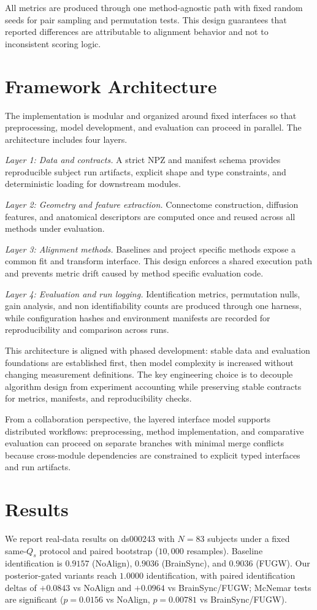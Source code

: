 \documentclass[conference]{IEEEtran}
\begin{document}
All metrics are produced through one method-agnostic path with fixed random seeds for pair sampling and permutation tests. This design guarantees that reported differences are attributable to alignment behavior and not to inconsistent scoring logic.

\section{Framework Architecture}
The implementation is modular and organized around fixed interfaces so that preprocessing, model development, and evaluation can proceed in parallel. The architecture includes four layers.

\textit{Layer 1: Data and contracts.} A strict NPZ and manifest schema provides reproducible subject run artifacts, explicit shape and type constraints, and deterministic loading for downstream modules.

\textit{Layer 2: Geometry and feature extraction.} Connectome construction, diffusion features, and anatomical descriptors are computed once and reused across all methods under evaluation.

\textit{Layer 3: Alignment methods.} Baselines and project specific methods expose a common fit and transform interface. This design enforces a shared execution path and prevents metric drift caused by method specific evaluation code.

\textit{Layer 4: Evaluation and run logging.} Identification metrics, permutation nulls, gain analysis, and non identifiability counts are produced through one harness, while configuration hashes and environment manifests are recorded for reproducibility and comparison across runs.

This architecture is aligned with phased development: stable data and evaluation foundations are established first, then model complexity is increased without changing measurement definitions. The key engineering choice is to decouple algorithm design from experiment accounting while preserving stable contracts for metrics, manifests, and reproducibility checks.

From a collaboration perspective, the layered interface model supports distributed workflows: preprocessing, method implementation, and comparative evaluation can proceed on separate branches with minimal merge conflicts because cross-module dependencies are constrained to explicit typed interfaces and run artifacts.

\section{Results}
We report real-data results on ds000243 with $N=83$ subjects under a fixed same-$Q_s$ protocol and paired bootstrap ($10{,}000$ resamples). Baseline identification is $0.9157$ (NoAlign), $0.9036$ (BrainSync), and $0.9036$ (FUGW). Our posterior-gated variants reach $1.0000$ identification, with paired identification deltas of $+0.0843$ vs NoAlign and $+0.0964$ vs BrainSync/FUGW; McNemar tests are significant ($p=0.0156$ vs NoAlign, $p=0.00781$ vs BrainSync/FUGW).
\end{document}
